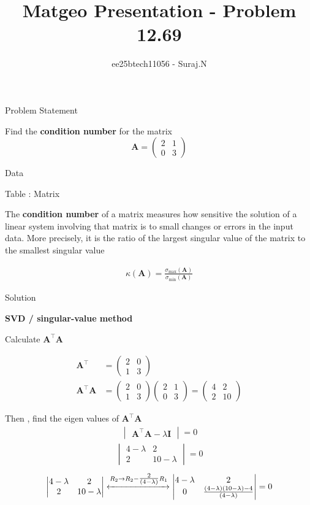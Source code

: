 \documentclass{beamer}
\title{Matgeo Presentation - Problem 12.69}
\author{ee25btech11056 - Suraj.N}
\numberwithin{equation}{section}
\theoremstyle{remark}
\newcommand{\myvec}[1]{\ensuremath{\begin{pmatrix}#1\end{pmatrix}}}
\newcommand{\mydet}[1]{\ensuremath{\begin{vmatrix}#1\end{vmatrix}}}
\let\vec\mathbf
\begin{document}
\begin{frame}
  \titlepage
\end{frame}

\begin{frame}{Problem Statement}

Find the \textbf{condition number} for the matrix
\[
\vec{A} = \myvec{2 & 1 \\ 0 & 3}
\]

\end{frame}

\begin{frame}{Data}

\begin{table}[h!]
  \centering
  
  \caption*{Table : Matrix}
  \label{12.69}
\end{table}

The \textbf{condition number} of a matrix measures how sensitive the solution of a linear system involving that matrix is to small changes or errors in the input data. More precisely, it is the ratio of the largest singular value of the matrix to the smallest singular value

\begin{align}
\kappa(\vec{A}) = \frac{\sigma_{\max}(\vec{A})}{\sigma_{\min}(\vec{A})} 
\end{align}

\end{frame}

\begin{frame}{Solution}

\textbf{SVD / singular-value method}

Calculate $\vec{A}^\top\vec{A}$

\begin{align}
\vec{A}^\top &= \myvec{2 & 0 \\ 1 & 3} \\
\vec{A}^\top\vec{A} &= \myvec{2 & 0 \\ 1 & 3}\myvec{2 & 1 \\ 0 & 3}
= \myvec{4 & 2 \\ 2 & 10}
\end{align}

Then , find the eigen values of $\vec{A}^\top\vec{A}$
\begin{align}
\mydet{\vec{A}^\top\vec{A}-\lambda\vec{I}} = 0 
\end{align}
\begin{align}
\mydet{4-\lambda & 2 \\ 2 & 10-\lambda} = 0 
\end{align}
\begin{align}
\mydet{4-\lambda & 2 \\ 2 & 10-\lambda} 
\xleftrightarrow{R_2 \to R_2 -\tfrac{2}{(4-\lambda)}R_1}
\mydet{4-\lambda & 2 \\ 0 & \frac{(4-\lambda)(10-\lambda)-4}{(4-\lambda)}} = 0
\end{align}

\end{frame}
\end{document}
